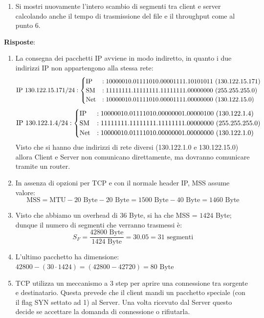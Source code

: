 \documentclass[10pt,a4paper]{article}
\begin{document}
	\begin{enumerate}[resume]
		\item Si mostri nuovamente l'intero scambio di segmenti tra client e server calcolando anche il tempo di trasmissione del file e il throughput come al punto 6.
	\end{enumerate}
	\textbf{Risposte}:
	\begin{enumerate}
		\item La consegna dei pacchetti IP avviene in modo indiretto, in quanto i due indirizzi IP non appartengono alla stessa rete:
			\[
				\textnormal{IP } 130.122.15.171/24:
				\begin{cases}
					\textnormal{IP} & : 10000010.01111010.00001111.10101011 \,\,(130.122.15.171)\\
					\textnormal{SM} & : 11111111.11111111.11111111.00000000 \,\,(255.255.255.0) \\
					\textnormal{Net} & : 10000010.01111010.00001111.00000000 \,\,(130.122.15.0)
				\end{cases}
			\]
			\[
				\textnormal{IP } 130.122.1.4/24:
				\begin{cases}
					\textnormal{IP} & : 10000010.01111010.00000001.00000100 \,\,(130.122.1.4)\\
					\textnormal{SM} & : 11111111.11111111.11111111.00000000 \,\,(255.255.255.0) \\
					\textnormal{Net} & : 10000010.01111010.00000001.00000000 \,\,(130.122.1.0)
				\end{cases}
			\]
			Visto che si hanno due indirizzi di rete diversi (130.122.1.0 e 130.122.15.0) allora Client e Server non comunicano direttamente, ma dovranno comunicare tramite un router.
		\item In assenza di opzioni per TCP e con il normale header IP, MSS assume valore: $$\textrm{MSS} = \textrm{MTU} - 20 \textrm{ Byte} - 20 \textrm{ Byte} = 1500 \textrm{ Byte} - 40 \textrm{ Byte} = 1460 \textrm{ Byte}$$
		\item Visto che abbiamo un overhead di $36$ Byte, si ha che MSS = $1424$ Byte; dunque il numero di segmenti che verranno trasmessi è:
		$$S_F = \frac{42800 \textrm{ Byte}}{1424 \textrm{ Byte}} = 30.05 = 31 \textrm{ segmenti}$$
		\item L'ultimo pacchetto ha dimensione: $42800 - (30 \cdot 1424) = (42800 - 42720) = 80 \textrm{ Byte}$
		\item TCP utilizza un meccanismo a 3 step per aprire una connessione tra sorgente e destinatario. Questa prevede che il client mandi un pacchetto speciale (con il flag SYN settato ad 1) al Server. Una volta ricevuto dal Server questo decide se accettare la domanda di connessione o rifiutarla. 

\end{enumerate}
\end{document}
